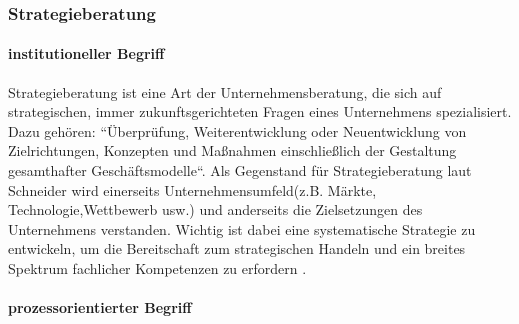 
\subsubsection*{Strategieberatung}

\paragraph*{institutioneller Begriff}

 Strategieberatung ist eine Art der Unternehmensberatung, die sich auf strategischen, immer zukunftsgerichteten Fragen eines Unternehmens spezialisiert. Dazu gehören: ``Überprüfung, Weiterentwicklung oder Neuentwicklung von Zielrichtungen, Konzepten und Maßnahmen einschließlich der Gestaltung gesamthafter Geschäftsmodelle``\cite [424]{ReinekeBock200709}. Als Gegenstand für Strategieberatung laut Schneider wird einerseits Unternehmensumfeld(z.B. Märkte, Technologie,Wettbewerb usw.) und anderseits die Zielsetzungen des Unternehmens verstanden. Wichtig ist dabei eine systematische Strategie zu entwickeln, um die Bereitschaft zum strategischen Handeln und ein breites Spektrum fachlicher Kompetenzen zu erfordern \cite [424]{ReinekeBock200709}.

\paragraph*{prozessorientierter Begriff}

